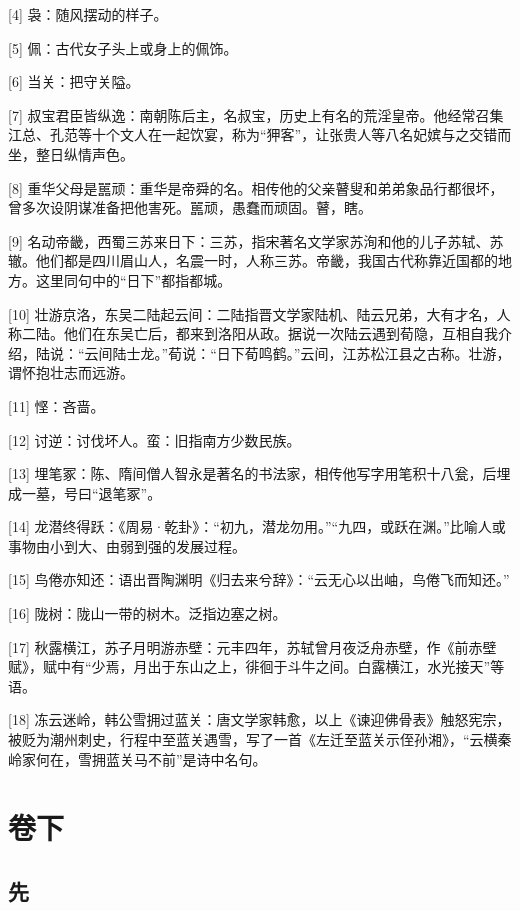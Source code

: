 \documentclass[12pt,UTF8]{ctexbook}
\begin{document}
[4] 袅：随风摆动的样子。

[5] 佩：古代女子头上或身上的佩饰。

[6] 当关：把守关隘。

[7] 叔宝君臣皆纵逸：南朝陈后主，名叔宝，历史上有名的荒淫皇帝。他经常召集江总、孔范等十个文人在一起饮宴，称为“狎客”，让张贵人等八名妃嫔与之交错而坐，整日纵情声色。

[8] 重华父母是嚚顽：重华是帝舜的名。相传他的父亲瞽叟和弟弟象品行都很坏，曾多次设阴谋准备把他害死。嚚顽，愚蠢而顽固。瞽，瞎。

[9] 名动帝畿，西蜀三苏来日下：三苏，指宋著名文学家苏洵和他的儿子苏轼、苏辙。他们都是四川眉山人，名震一时，人称三苏。帝畿，我国古代称靠近国都的地方。这里同句中的“日下”都指都城。

[10] 壮游京洛，东吴二陆起云间：二陆指晋文学家陆机、陆云兄弟，大有才名，人称二陆。他们在东吴亡后，都来到洛阳从政。据说一次陆云遇到荀隐，互相自我介绍，陆说：“云间陆士龙。”荀说：“日下荀鸣鹤。”云间，江苏松江县之古称。壮游，谓怀抱壮志而远游。

[11] 悭：吝啬。

[12] 讨逆：讨伐坏人。蛮：旧指南方少数民族。

[13] 埋笔冢：陈、隋间僧人智永是著名的书法家，相传他写字用笔积十八瓮，后埋成一墓，号曰“退笔冢”。

[14] 龙潜终得跃：《周易·乾卦》：“初九，潜龙勿用。”“九四，或跃在渊。”比喻人或事物由小到大、由弱到强的发展过程。

[15] 鸟倦亦知还：语出晋陶渊明《归去来兮辞》：“云无心以出岫，鸟倦飞而知还。”

[16] 陇树：陇山一带的树木。泛指边塞之树。

[17] 秋露横江，苏子月明游赤壁：元丰四年，苏轼曾月夜泛舟赤壁，作《前赤壁赋》，赋中有“少焉，月出于东山之上，徘徊于斗牛之间。白露横江，水光接天”等语。

[18] 冻云迷岭，韩公雪拥过蓝关：唐文学家韩愈，以上《谏迎佛骨表》触怒宪宗，被贬为潮州刺史，行程中至蓝关遇雪，写了一首《左迁至蓝关示侄孙湘》，“云横秦岭家何在，雪拥蓝关马不前”是诗中名句。





\part{卷下}

\setcounter{chapter}{0}

\chapter{先}
\end{document}
